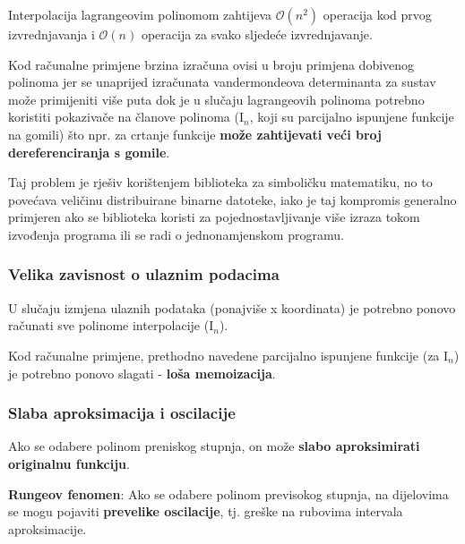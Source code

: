 Interpolacija lagrangeovim polinomom zahtijeva $\mathcal{O}(n^2)$ operacija kod prvog izvrednjavanja i $\mathcal{O}(n)$ operacija za svako sljedeće izvrednjavanje.

Kod računalne primjene brzina izračuna ovisi u broju primjena dobivenog polinoma jer se unaprijed izračunata vandermondeova determinanta za sustav može primijeniti više puta dok je u slučaju lagrangeovih polinoma potrebno koristiti pokazivače na članove polinoma ($\mathrm{I}_n$, koji su parcijalno ispunjene funkcije na gomili) što npr. za crtanje funkcije \textbf{može zahtijevati veći broj dereferenciranja s gomile}.

Taj problem je rješiv korištenjem biblioteka za simboličku matematiku, no to povećava veličinu distribuirane binarne datoteke, iako je taj kompromis generalno primjeren ako se biblioteka koristi za pojednostavljivanje više izraza tokom izvođenja programa ili se radi o jednonamjenskom programu.

\subsubsection{Velika zavisnost o ulaznim podacima}

U slučaju izmjena ulaznih podataka (ponajviše x koordinata) je potrebno ponovo računati sve polinome interpolacije ($\mathrm{I}_n$).

Kod računalne primjene, prethodno navedene parcijalno ispunjene funkcije (za $\mathrm{I}_n$) je potrebno ponovo slagati - \textbf{loša memoizacija}.

\subsubsection{Slaba aproksimacija i oscilacije}

Ako se odabere polinom preniskog stupnja, on može \textbf{slabo aproksimirati originalnu funkciju}.

\textbf{Rungeov fenomen}: Ako se odabere polinom previsokog stupnja, na dijelovima se mogu pojaviti \textbf{prevelike oscilacije}, tj. greške na rubovima intervala aproksimacije.

